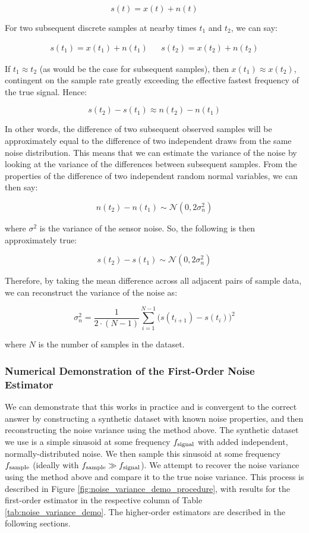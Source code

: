 \documentclass[conf]{new-aiaa}
\begin{document}
    $$s(t) = x(t) + n(t)$$

    \noindent For two subsequent discrete samples at nearby times $t_1$ and $t_2$, we can say:

    \begin{align*}
        s(t_1) = x(t_1) + n(t_1) &&
        s(t_2) = x(t_2) + n(t_2)
    \end{align*}

    \noindent If $t_1 \approx t_2$ (as would be the case for subsequent samples), then $x(t_1) \approx x(t_2)$, contingent on the sample rate greatly exceeding the effective fastest frequency of the true signal. Hence:

    $$s(t_2) - s(t_1) \approx n(t_2) - n(t_1)$$

    In other words, the difference of two subsequent observed samples will be approximately equal to the difference of two independent draws from the same noise distribution. This means that we can estimate the variance of the noise by looking at the variance of the differences between subsequent samples. From the properties of the difference of two independent random normal variables, we can then say:

    $$n(t_2) - n(t_1) \sim \mathcal{N}(0, 2\sigma^2_n)$$

    \noindent where $\sigma^2$ is the variance of the sensor noise. So, the following is then approximately true:

    $$s(t_2) - s(t_1) \sim \mathcal{N}(0, 2\sigma^2_n)$$

    Therefore, by taking the mean difference across all adjacent pairs of sample data, we can reconstruct the variance of the noise as:

    \begin{equation}
        \sigma^2_n = \frac{1}{2 \cdot (N-1)} \sum_{i=1}^{N-1} \Big( s(t_{i+1}) - s(t_i) \Big)^2
        \label{eq:1st_order_noise_estimator}
    \end{equation}

    \noindent where $N$ is the number of samples in the dataset.

    \subsubsection{Numerical Demonstration of the First-Order Noise Estimator}

    We can demonstrate that this works in practice and is convergent to the correct answer by constructing a synthetic dataset with known noise properties, and then reconstructing the noise variance using the method above. The synthetic dataset we use is a simple sinusoid at some frequency $f_{\rm signal}$ with added independent, normally-distributed noise. We then sample this sinusoid at some frequency $f_{\rm sample}$ (ideally with $f_{\rm sample} \gg f_{\rm signal}$). We attempt to recover the noise variance using the method above and compare it to the true noise variance. This process is described in Figure \ref{fig:noise_variance_demo_procedure}, with results for the first-order estimator in the respective column of Table \ref{tab:noise_variance_demo}. The higher-order estimators are described in the following sections.
\end{document}
